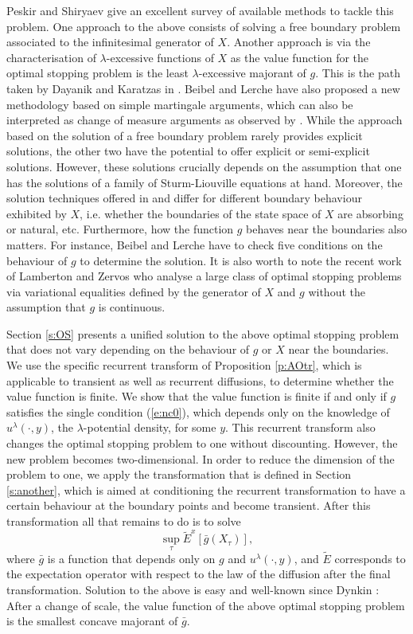 \documentclass[11pt,reqno]{amsart}
\numberwithin{equation}{section}
\begin{document}
Peskir and Shiryaev \cite{PS} give an excellent survey of available methods to tackle this problem. One approach to the above consists of solving  a free boundary problem associated to the infinitesimal generator of $X$. Another approach is via the characterisation of $\lambda$-excessive functions of $X$ as the value function for the optimal stopping problem is the least $\lambda$-excessive majorant of $g$. This is the path taken by Dayanik and Karatzas in \cite{DK}.  Beibel and Lerche \cite{BL} have also proposed a new methodology based on simple martingale arguments, which can also be interpreted as change of measure arguments as observed by \cite{LU}. While the approach based on the solution of a free boundary problem rarely provides explicit solutions, the other two have the potential to offer explicit or semi-explicit solutions. However, these solutions  crucially depends on the assumption that one has the solutions of a family of Sturm-Liouville equations at hand. Moreover, the solution techniques offered in \cite{DK} and \cite{BL} differ for different boundary behaviour exhibited by $X$,  i.e. whether the boundaries  of the state space of $X$ are absorbing or natural, etc. Furthermore, how the function $g$ behaves near the boundaries also matters. For instance, Beibel and Lerche \cite{BL} have to check five conditions on the behaviour of $g$ to determine the solution. It is also worth to note the recent work of  Lamberton and Zervos \cite{LZ} who analyse a large class of optimal stopping problems via variational equalities defined by the generator of $X$ and $g$ without the assumption that $g$ is continuous. 

Section \ref{s:OS} presents a unified solution to the above optimal stopping problem that does not vary depending on the behaviour of $g$ or $X$ near the boundaries. We use the specific recurrent transform of Proposition \ref{p:AOtr}, which is applicable to transient as well as recurrent diffusions, to determine whether the value function is finite. We show that  the value function is finite if and only if  $g$ satisfies the single condition (\ref{e:nc0}), which depends only on the knowledge of $u^{\lambda}(\cdot, y)$, the $\lambda$-potential density, for some $y$. This recurrent transform also changes the optimal stopping problem to one without discounting. However, the new problem becomes two-dimensional. In order to reduce the dimension of the problem to one, we apply the transformation that is defined in Section \ref{s:another}, which is aimed at conditioning the recurrent transformation to have a certain behaviour at the boundary points and become transient. After this transformation all that remains to do is to solve 
\[
\sup_{\tau}\tilde{E}^x[\bar{g}(X_{\tau})],
\]
where $\bar{g}$ is a function that depends only on $g$ and $u^{\lambda}(\cdot,y)$, and $\tilde{E}$ corresponds to the expectation operator with respect to the law of the diffusion after the final transformation. Solution to the above is easy and well-known since Dynkin \cite{Dyn}: After a change of scale, the value function of the above optimal stopping problem is the smallest concave majorant of $\bar{g}$. 
\end{document}
